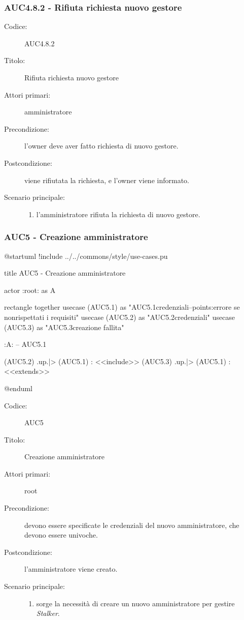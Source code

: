 \documentclass[casi-duso]{subfiles}
\begin{document}
\subsubsection{AUC4.8.2 - Rifiuta richiesta nuovo gestore}%
\label{subsub:AUC4.8.2}
\begin{description}
  \item[Codice:] AUC4.8.2
  \item[Titolo:] Rifiuta richiesta nuovo gestore
  \item[Attori primari:] amministratore
  \item[Precondizione:] l'owner deve aver fatto richiesta di nuovo gestore.
  \item[Postcondizione:] viene rifiutata la richiesta, e l'owner viene informato.
  \item[Scenario principale:]
  \begin{enumerate}
    \item l'amministratore rifiuta la richiesta di nuovo gestore.
  \end{enumerate}
\end{description}  

\subsubsection{AUC5 - Creazione amministratore}%
\label{subsub:AUC5}

\begin{plantuml}
@startuml
!include ../../commons/style/use-cases.pu

title AUC5 - Creazione amministratore

actor :root: as A

rectangle {
  together {
    usecase (AUC5.1) as "AUC5.1\nInserimento credenziali\n--\nExtension points:\nvisualizzazione errore se non\nvengono rispettati i requisiti"
    usecase (AUC5.2) as "AUC5.2\nVerifica credenziali"
    usecase (AUC5.3) as "AUC5.3\nVisualizza creazione fallita"
  }
}

:A: -- AUC5.1

(AUC5.2) .up.|> (AUC5.1) : <<include>>
(AUC5.3) .up.|> (AUC5.1) : <<extends>>

@enduml
\end{plantuml}

\begin{description}
  \item[Codice:] AUC5
  \item[Titolo:] Creazione amministratore
  \item[Attori primari:] root
  \item[Precondizione:] devono essere specificate le credenziali del nuovo amministratore, che devono essere univoche.
  \item[Postcondizione:] l'amministratore viene creato.
  \item[Scenario principale:]
  \begin{enumerate}
    \item sorge la necessità di creare un nuovo amministratore per gestire \emph{Stalker}.
  \end{enumerate}
\end{description}
\end{document}
